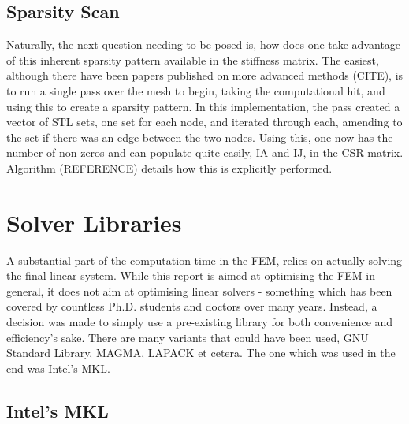 \subsection{Sparsity Scan}\label{sparsity}

Naturally, the next question needing to be posed is, how does one take advantage of this inherent sparsity pattern available in the stiffness matrix. The easiest, although there have been papers published on more advanced methods (CITE), is to run a single pass over the mesh to begin, taking the computational hit, and using this to create a sparsity pattern. In this implementation, the pass created a vector of STL sets, one set for each node, and iterated through each, amending to the set if there was an edge between the two nodes. Using this, one now has the number of non-zeros and can populate quite easily, IA and IJ, in the CSR matrix. Algorithm (REFERENCE) details how this is explicitly performed.

\section{Solver Libraries}

A substantial part of the computation time in the FEM, relies on actually solving the final linear system. While this report is aimed at optimising the FEM in general, it does not aim at optimising linear solvers - something which has been covered by countless Ph.D. students and doctors over many years. Instead, a decision was made to simply use a pre-existing library for both convenience and efficiency's sake. There are many variants that could have been used, GNU Standard Library, MAGMA, LAPACK et cetera. The one which was used in the end was Intel's MKL.

\subsection{Intel's MKL}\label{mkl}

